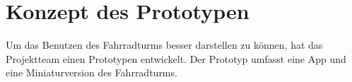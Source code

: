 \section{Konzept des Prototypen}

Um das Benutzen des Fahrradturms besser darstellen zu können, hat das Projektteam einen Prototypen entwickelt. Der Prototyp umfasst eine App und eine Miniaturversion des Fahrradturms.



\clearpage


\clearpage

